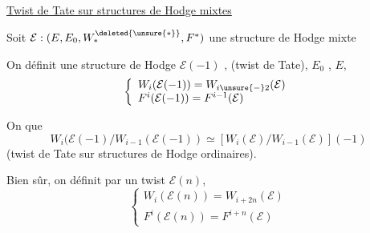 \uline{Twist de Tate sur structures de Hodge mixtes}

Soit $\mathcal E:(E,E_0,W_*^{\deleted{\unsure{*}}},F^*)$ une structure de Hodge mixte

On définit une structure de Hodge $\mathcal E(-1)$ , (twist de Tate),  $E_0$ ,  $E$,
\[
\left\{\begin{array}{l}
W_i(\mathcal E(-1))=W_{i\unsure{-}2}(\mathcal E)\\
F^i(\mathcal E(-1))=F^{i-1}(\mathcal E)
\end{array}\right.
\]

On  que
\[
W_i(\mathcal E(-1)/W_{i-1}(\mathcal E(-1))\simeq
[W_i(\mathcal E)/W_{i-1}(\mathcal E)](-1)
\]
(twist de Tate sur structures de Hodge ordinaires).

Bien sûr, on définit par  un twist $\mathcal E(n)$,
\[
\left\{\begin{array}{l}
W_i(\mathcal E(n))=W_{i+2n}(\mathcal E)\\
F^i(\mathcal E(n))=F^{i+n}(\mathcal E)
\end{array}\right.
\]
